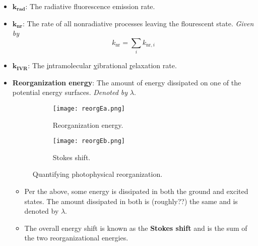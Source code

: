 \documentclass[../notes.tex]{subfiles}
\begin{document}
\begin{itemize}
\begin{itemize}
        \begin{itemize}
            \item The vibrational period of a molecule is \SIrange{10}{100}{\femto\second}.
            \item Vibrational relaxation in solution takes \SIrange{1}{10}{\pico\second}.
            \item Fluorescence emission takes \SIrange{1}{10}{\nano\second}.
        \end{itemize}
        \item Once you get into the ground state, you have further vibrational relaxation.
    \end{itemize}
    \item $\bm{k_\textbf{rad}}$: The radiative fluorescence emission rate.
    \item $\bm{k_\textbf{nr}}$: The rate of all nonradiative processes leaving the flourescent state. \emph{Given by}
    \begin{equation*}
        k_\text{nr} = \sum_ik_{\text{nr},i}
    \end{equation*}
    \item $\bm{k_\textbf{IVR}}$: The \underline{i}ntramolecular \underline{v}ibrational \underline{r}elaxation rate.
    \item \textbf{Reorganization energy}: The amount of energy dissipated on one of the potential energy surfaces. \emph{Denoted by} $\lambda$.
    \begin{figure}[H]
        \centering
        \begin{subfigure}[b]{0.35\linewidth}
            \centering
            \texttt{[image: reorgEa.png]}
            \caption{Reorganization energy.}
            \label{fig:reorgEa}
        \end{subfigure}
        \begin{subfigure}[b]{0.35\linewidth}
            \centering
            \texttt{[image: reorgEb.png]}
            \caption{Stokes shift.}
            \label{fig:reorgEb}
        \end{subfigure}
        \caption{Quantifying photophysical reorganization.}
        \label{fig:reorgE}
    \end{figure}
    \begin{itemize}
        \item Per the above, some energy is dissipated in both the ground and excited states. The amount dissipated in both is (roughly??) the same and is denoted by $\lambda$.
        \item The overall energy shift is known as the \textbf{Stokes shift} and is the sum of the two reorganizational energies.

\end{itemize}
\end{itemize}
\end{document}

